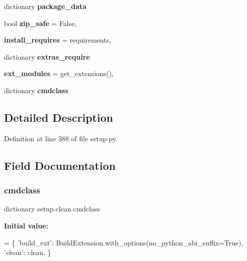 \begin{DoxyCompactItemize}
\item 
dictionary {\bfseries package\+\_\+data}
\item 
\mbox{\label{classsetup_1_1clean_a8bb5dcaefc8ec10ad2d5a20182fcb720}} 
bool {\bfseries zip\+\_\+safe} = False,
\item 
\mbox{\label{classsetup_1_1clean_ab73024260f319e069b135def3314c719}} 
{\bfseries install\+\_\+requires} = requirements,
\item 
dictionary {\bfseries extras\+\_\+require}
\item 
\mbox{\label{classsetup_1_1clean_a9f4239184eb03351d7c23df620f43d29}} 
{\bfseries ext\+\_\+modules} = get\+\_\+extensions(),
\item 
dictionary {\bfseries cmdclass}
\end{DoxyCompactItemize}


\subsection{Detailed Description}


Definition at line 388 of file setup.\+py.



\subsection{Field Documentation}
\mbox{\label{classsetup_1_1clean_a158422858fc2fab780a3fa2ef764c157}} 
\subsubsection{\texorpdfstring{cmdclass}{cmdclass}}
{\footnotesize\ttfamily dictionary setup.\+clean.\+cmdclass\hspace{0.3cm}{\ttfamily [static]}}

{\bfseries Initial value\+:}
\begin{DoxyCode}
= \{
        \textcolor{stringliteral}{'build\_ext'}: BuildExtension.with\_options(no\_python\_abi\_suffix=\textcolor{keyword}{True}),
        \textcolor{stringliteral}{'clean'}: clean,
    \}
\end{DoxyCode}


